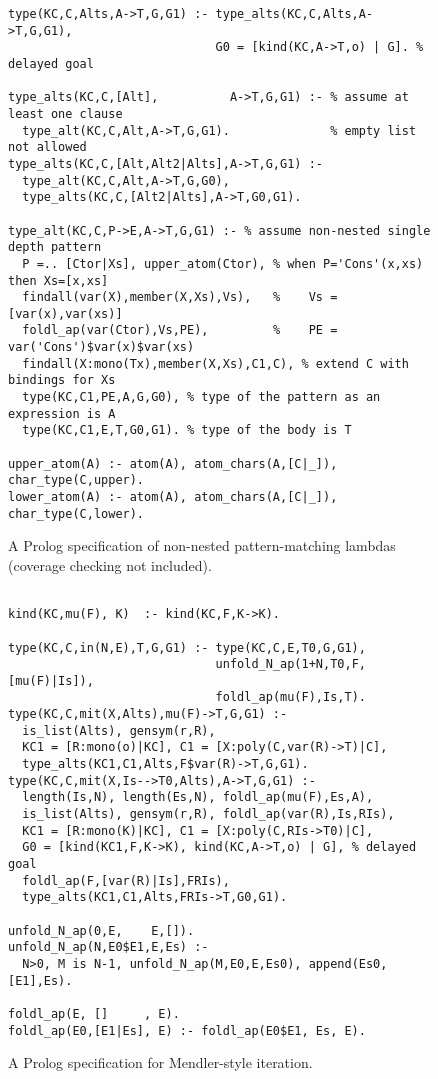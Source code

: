 \documentclass[runningheads,a4paper]{llncs}
\begin{document}
\begin{figure}
\begin{verbatim}
type(KC,C,Alts,A->T,G,G1) :- type_alts(KC,C,Alts,A->T,G,G1),
                             G0 = [kind(KC,A->T,o) | G]. % delayed goal

type_alts(KC,C,[Alt],          A->T,G,G1) :- % assume at least one clause
  type_alt(KC,C,Alt,A->T,G,G1).              % empty list not allowed
type_alts(KC,C,[Alt,Alt2|Alts],A->T,G,G1) :-
  type_alt(KC,C,Alt,A->T,G,G0),
  type_alts(KC,C,[Alt2|Alts],A->T,G0,G1).

type_alt(KC,C,P->E,A->T,G,G1) :- % assume non-nested single depth pattern
  P =.. [Ctor|Xs], upper_atom(Ctor), % when P='Cons'(x,xs) then Xs=[x,xs]
  findall(var(X),member(X,Xs),Vs),   %    Vs = [var(x),var(xs)]  
  foldl_ap(var(Ctor),Vs,PE),         %    PE = var('Cons')$var(x)$var(xs)
  findall(X:mono(Tx),member(X,Xs),C1,C), % extend C with bindings for Xs
  type(KC,C1,PE,A,G,G0), % type of the pattern as an expression is A
  type(KC,C1,E,T,G0,G1). % type of the body is T

upper_atom(A) :- atom(A), atom_chars(A,[C|_]), char_type(C,upper).
lower_atom(A) :- atom(A), atom_chars(A,[C|_]), char_type(C,lower).
\end{verbatim}
\vspace*{-1ex}
\caption{A Prolog specification of non-nested pattern-matching lambdas
$\qquad$ (coverage checking not included).}
\label{fig:patlam}
\end{figure}
\begin{figure}
\begin{verbatim}

kind(KC,mu(F), K)  :- kind(KC,F,K->K).

type(KC,C,in(N,E),T,G,G1) :- type(KC,C,E,T0,G,G1),
                             unfold_N_ap(1+N,T0,F,[mu(F)|Is]),
                             foldl_ap(mu(F),Is,T).
type(KC,C,mit(X,Alts),mu(F)->T,G,G1) :-
  is_list(Alts), gensym(r,R),
  KC1 = [R:mono(o)|KC], C1 = [X:poly(C,var(R)->T)|C],
  type_alts(KC1,C1,Alts,F$var(R)->T,G,G1).
type(KC,C,mit(X,Is-->T0,Alts),A->T,G,G1) :-
  length(Is,N), length(Es,N), foldl_ap(mu(F),Es,A),
  is_list(Alts), gensym(r,R), foldl_ap(var(R),Is,RIs),
  KC1 = [R:mono(K)|KC], C1 = [X:poly(C,RIs->T0)|C],
  G0 = [kind(KC1,F,K->K), kind(KC,A->T,o) | G], % delayed goal
  foldl_ap(F,[var(R)|Is],FRIs),
  type_alts(KC1,C1,Alts,FRIs->T,G0,G1).

unfold_N_ap(0,E,    E,[]).
unfold_N_ap(N,E0$E1,E,Es) :-
  N>0, M is N-1, unfold_N_ap(M,E0,E,Es0), append(Es0,[E1],Es).

foldl_ap(E, []     , E).
foldl_ap(E0,[E1|Es], E) :- foldl_ap(E0$E1, Es, E).
\end{verbatim}
\vspace*{-1ex}
\caption{A Prolog specification for Mendler-style iteration.}
\label{fig:mit}
\end{figure}
\end{document}
